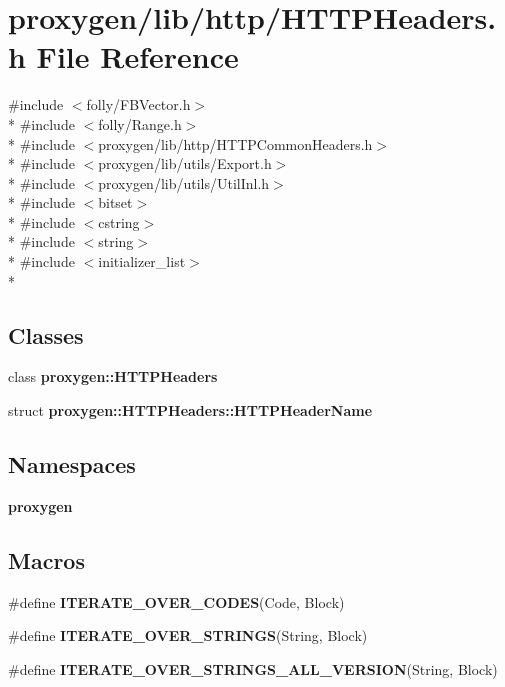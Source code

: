 \section{proxygen/lib/http/\+H\+T\+T\+P\+Headers.h File Reference}
\label{HTTPHeaders_8h}
{\ttfamily \#include $<$folly/\+F\+B\+Vector.\+h$>$}\\*
{\ttfamily \#include $<$folly/\+Range.\+h$>$}\\*
{\ttfamily \#include $<$proxygen/lib/http/\+H\+T\+T\+P\+Common\+Headers.\+h$>$}\\*
{\ttfamily \#include $<$proxygen/lib/utils/\+Export.\+h$>$}\\*
{\ttfamily \#include $<$proxygen/lib/utils/\+Util\+Inl.\+h$>$}\\*
{\ttfamily \#include $<$bitset$>$}\\*
{\ttfamily \#include $<$cstring$>$}\\*
{\ttfamily \#include $<$string$>$}\\*
{\ttfamily \#include $<$initializer\+\_\+list$>$}\\*
\subsection*{Classes}
\begin{DoxyCompactItemize}
\item 
class {\bf proxygen\+::\+H\+T\+T\+P\+Headers}
\item 
struct {\bf proxygen\+::\+H\+T\+T\+P\+Headers\+::\+H\+T\+T\+P\+Header\+Name}
\end{DoxyCompactItemize}
\subsection*{Namespaces}
\begin{DoxyCompactItemize}
\item 
 {\bf proxygen}
\end{DoxyCompactItemize}
\subsection*{Macros}
\begin{DoxyCompactItemize}
\item 
\#define {\bf I\+T\+E\+R\+A\+T\+E\+\_\+\+O\+V\+E\+R\+\_\+\+C\+O\+D\+ES}(Code,  Block)
\item 
\#define {\bf I\+T\+E\+R\+A\+T\+E\+\_\+\+O\+V\+E\+R\+\_\+\+S\+T\+R\+I\+N\+GS}(String,  Block)
\item 
\#define {\bf I\+T\+E\+R\+A\+T\+E\+\_\+\+O\+V\+E\+R\+\_\+\+S\+T\+R\+I\+N\+G\+S\+\_\+\+A\+L\+L\+\_\+\+V\+E\+R\+S\+I\+ON}(String,  Block)
\end{DoxyCompactItemize}
